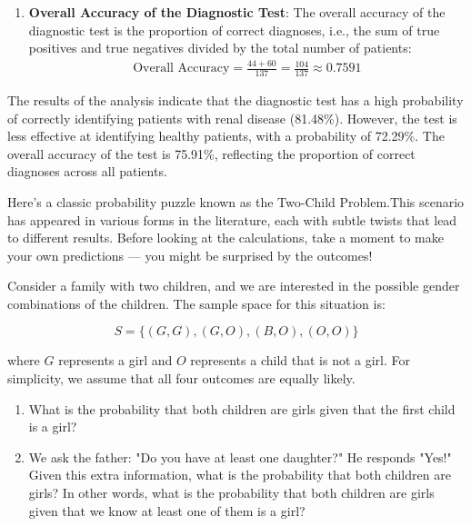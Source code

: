 \begin{solution}
\begin{enumerate}[label=(\alph*)]
        \item \textbf{Overall Accuracy of the Diagnostic Test}:
        The overall accuracy of the diagnostic test is the proportion of correct diagnoses, i.e., the sum of true positives and true negatives divided by the total number of patients:
        \begin{align*}
            \text{Overall Accuracy} =\frac{44+60}{137}=\frac{104}{137} \approx 0.7591
        \end{align*}
    \end{enumerate}


The results of the analysis indicate that the diagnostic test has a high probability of correctly identifying patients with renal disease (81.48\%). However, the test is less effective at identifying healthy patients, with a probability of 72.29\%. The overall accuracy of the test is 75.91\%, reflecting the proportion of correct diagnoses across all patients.
\end{solution}

Here’s a classic probability puzzle known as the Two-Child Problem.This scenario has appeared in various forms in the literature, each with subtle twists that lead to different results. Before looking at the calculations, take a moment to make your own predictions — you might be surprised by the outcomes!

\begin{example}
    Consider a family with two children, and we are interested in the possible gender combinations of the children. The sample space for this situation is:

\[
S = \{(G, G), (G, O), (B, O), (O, O)\}
\]

where \( G \) represents a girl and \( O \) represents a child that is not a girl. For simplicity, we assume that all four outcomes are equally likely.

\begin{enumerate}[label=(\alph*)]
    \item What is the probability that both children are girls given that the first child is a girl?
    \item We ask the father: "Do you have at least one daughter?" He responds "Yes!" Given this extra information, what is the probability that both children are girls? In other words, what is the probability that both children are girls given that we know at least one of them is a girl?
\end{enumerate}
\end{example}

